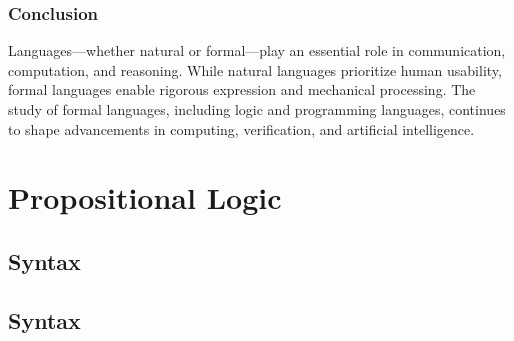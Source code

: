 \documentclass{book}
\begin{document}
\hypertarget{book__pandoc__debug__src__languages.md__conclusion}{%
\subsection*{Conclusion}\label{book__pandoc__debug__src__languages.md__conclusion}}

Languages---whether natural or formal---play an essential role in communication, computation, and reasoning. While natural languages prioritize human usability, formal languages enable rigorous expression and mechanical processing. The study of formal languages, including logic and programming languages, continues to shape advancements in computing, verification, and artificial intelligence.

\hypertarget{book__pandoc__debug__src__proplogic.md}{}
\hypertarget{book__pandoc__debug__src__proplogic.md__propositional-logic}{%
\chapter{Propositional Logic}\label{book__pandoc__debug__src__proplogic.md__propositional-logic}}

\hypertarget{book__pandoc__debug__src__dmt1__lectures__l02_proplogic__formal__syntax.lean.md}{}
\hypertarget{book__pandoc__debug__src__dmt1__lectures__l02_proplogic__formal__syntax.lean.md__syntax}{%
\section{Syntax}\label{book__pandoc__debug__src__dmt1__lectures__l02_proplogic__formal__syntax.lean.md__syntax}}

\hypertarget{book__pandoc__debug__src__dmt1__library__proplogic__syntax.lean.md}{}
\hypertarget{book__pandoc__debug__src__dmt1__library__proplogic__syntax.lean.md__syntax}{%
\section{Syntax}\label{book__pandoc__debug__src__dmt1__library__proplogic__syntax.lean.md__syntax}}
\end{document}
